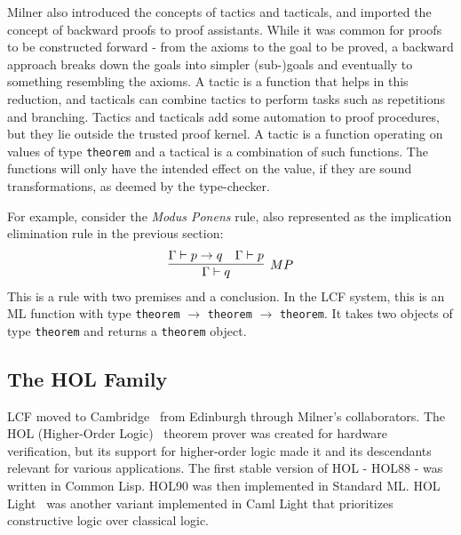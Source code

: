 \documentclass{article}
\begin{document}
	Milner also introduced the concepts of 
	tactics and tacticals, and imported the 
	concept of backward proofs to proof 
	assistants. While it was common for 
	proofs to be constructed forward - from 
	the axioms to the goal to be proved, a 
	backward approach breaks down the goals 
	into simpler (sub-)goals and eventually 
	to something resembling the axioms. A
	tactic is a function that helps in 
	this reduction, and tacticals can 
	combine tactics to perform tasks 
	such as repetitions and branching. 
	Tactics and tacticals add some 
	automation to proof procedures, but 
	they lie outside the trusted proof 
	kernel. A tactic is a function 
	operating on values of type 
	\texttt{theorem} and a tactical 
	is a combination of such functions. 
	The functions will only have the 
	intended effect on the value, if 
	they are sound transformations, 
	as deemed by the type-checker.
	
	For example, consider the 
	\textit{Modus Ponens} rule, also 
	represented as the 
	implication	elimination rule in 
	the previous section:
	\begin{align*}
		\infer[MP]{\Gamma \vdash q}
		{\Gamma \vdash p \to q & \Gamma \vdash p}
	\end{align*}
	This is a rule with two premises and a 
	conclusion. In the LCF system, this is an
	ML function with type
	\texttt{theorem} $\to$ \texttt{theorem}
	$\to$ \texttt{theorem}. It takes 
	two objects of type \texttt{theorem}
	and returns a \texttt{theorem} object.
	
	\subsection{The HOL Family}
	LCF moved to 
	Cambridge~\cite{10.5555/34057} 
	from Edinburgh
	through Milner's collaborators. The 
	HOL (Higher-Order 
	Logic)~\cite{10.5555/345868.345890}
	theorem prover was created for 
	hardware verification, but its support 
	for higher-order logic made it and 
	its descendants relevant for 
	various applications. The first 
	stable version of HOL - HOL88 - was
	written in Common Lisp. HOL90 was 
	then implemented in Standard ML. HOL 
	Light~\cite{10.1007/978-3-642-03359-9_4}
	was another variant implemented in Caml 
	Light that prioritizes constructive 
	logic over classical logic. 
	
\end{document}

